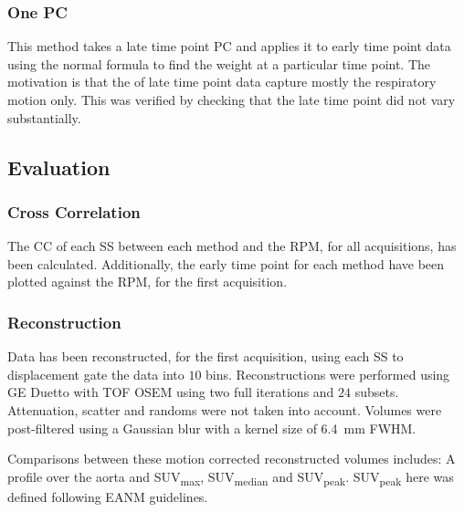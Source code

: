         \subsubsection{One \gls{PC}} \label{sec:one_pc}
            This method takes a late time point \gls{PC} and applies it to early time point data using the normal formula to find the weight at a particular time point. The motivation is that the  of late time point data capture mostly the respiratory motion only. This was verified by checking that the late time point  did not vary substantially.
            
    \vspace{-0.5cm}
    
    \subsection{Evaluation} \label{sec:evaluation}
        \subsubsection{Cross Correlation} \label{sec:cross_correlation}
            The \gls{CC} of each \gls{SS} between each method and the \gls{RPM}, for all acquisitions, has been calculated. Additionally, the early time point  for each method have been plotted against the \gls{RPM}, for the first acquisition.
        
        \subsubsection{Reconstruction} \label{sec:reconstruction}
            Data has been reconstructed, for the first acquisition, using each \gls{SS} to displacement gate the data into $10$ bins. Reconstructions were performed using \gls{GE} Duetto with \gls{TOF} \gls{OSEM} using two full iterations and $24$ subsets.%
            Attenuation, scatter and randoms were not taken into account. Volumes were post-filtered using a Gaussian blur with a kernel size of \SI{6.4}{\milli\metre} \gls{FWHM}.
            
            Comparisons between these motion corrected reconstructed volumes includes: A profile over the aorta and \gls{SUV}\textsubscript{max}, \gls{SUV}\textsubscript{median} and \gls{SUV}\textsubscript{peak}. \gls{SUV}\textsubscript{peak} here was defined following \gls{EANM} guidelines.%
            
\vspace{-0.5cm}
        
